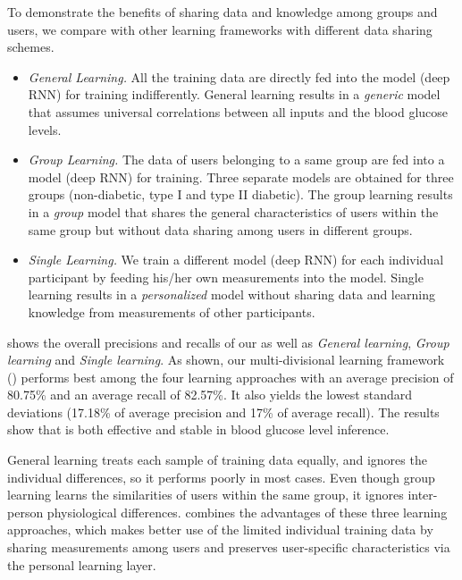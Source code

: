 To demonstrate the benefits of sharing data and knowledge among groups and users, we compare \modelname with other learning frameworks with different data sharing schemes.
\begin{itemize}
  \item \emph{General Learning.}
  All the training data are directly fed into the model (\ie deep RNN) for training indifferently.
  General learning results in a \emph{generic} model that assumes universal correlations between all inputs and the blood glucose levels.
  \item \emph{Group Learning.}
  The data of users belonging to a same group are fed into a model (\ie deep RNN) for training.
  Three separate models are obtained for three groups (\ie non-diabetic, type I and type II diabetic).
  The group learning results in a \emph{group} model that shares the general characteristics of users within the same group but without data sharing among users in different groups.
  \item \emph{Single Learning.}
  We train a different model (\ie deep RNN) for each individual participant by feeding his/her own measurements into the model.
  Single learning results in a \emph{personalized} model without sharing data and learning knowledge from measurements of other participants.
\end{itemize}

 shows the overall precisions and recalls of our \modelname as well as \emph{General learning}, \emph{Group learning} and \emph{Single learning}.
As shown, our multi-divisional learning framework (\modelname) performs best among the four learning approaches with an average precision of 80.75\% and an average recall of 82.57\%.
It also yields the lowest standard deviations (17.18\% of average precision and 17\% of average recall).
The results show that \modelname is both effective and stable in blood glucose level inference.

General learning treats each sample of training data equally, and ignores the individual differences, so it performs poorly in most cases.
Even though group learning learns the similarities of users within the same group, it ignores inter-person physiological differences.
\modelname combines the advantages of these three learning approaches, which makes better use of the limited individual training data by sharing measurements among users and preserves user-specific characteristics via the personal learning layer.

